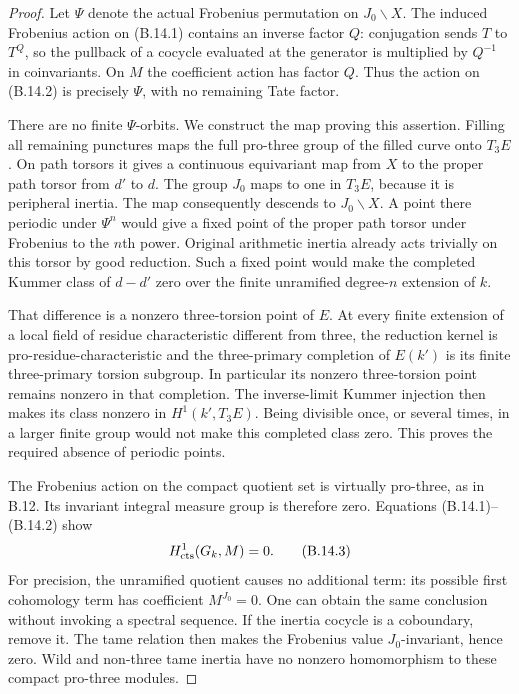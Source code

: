 \begin{proof}
Let $\Psi$ denote the actual Frobenius permutation
on $J_0\backslash X$.
The induced Frobenius action on (B.14.1) contains
an inverse factor $Q$: conjugation sends
$T$ to $T^Q$, so the pullback of a cocycle
evaluated at the generator is multiplied by
$Q^{-1}$ in coinvariants.
On $M$ the coefficient action has factor $Q$.
Thus the action on (B.14.2) is precisely $\Psi$,
with no remaining Tate factor.

There are no finite $\Psi$-orbits.
We construct the map proving this assertion.
Filling all remaining punctures maps the full
pro-three group of the filled curve onto $T_3E$.
On path torsors it gives a continuous equivariant
map from $X$ to the proper path torsor from
$d'$ to $d$. The group $J_0$ maps to one in
$T_3E$, because it is peripheral inertia.
The map consequently descends to
$J_0\backslash X$.
A point there periodic under $\Psi^n$ would
give a fixed point of the proper path torsor
under Frobenius to the $n$th power.
Original arithmetic inertia already acts
trivially on this torsor by good reduction.
Such a fixed point would make the completed
Kummer class of $d-d'$ zero over the finite
unramified degree-$n$ extension of $k$.

That difference is a nonzero three-torsion
point of $E$. At every finite extension of
a local field of residue characteristic
different from three, the reduction kernel
is pro-residue-characteristic and the
three-primary completion of $E(k')$ is its
finite three-primary torsion subgroup.
In particular its nonzero three-torsion
point remains nonzero in that completion.
The inverse-limit Kummer injection then
makes its class nonzero in $H^1(k',T_3E)$.
Being divisible once, or several times,
in a larger finite group would not make
this completed class zero. This proves
the required absence of periodic points.

The Frobenius action on the compact quotient
set is virtually pro-three, as in B.12.
Its invariant integral measure group is
therefore zero. Equations (B.14.1)--(B.14.2)
show
\[
             H^1_{\rm cts}(G_k,M)=0.                       \tag{B.14.3}
\]
For precision, the unramified quotient causes
no additional term: its possible first
cohomology term has coefficient $M^{J_0}=0$.
One can obtain the same conclusion without
invoking a spectral sequence. If the inertia
cocycle is a coboundary, remove it. The tame
relation then makes the Frobenius value
$J_0$-invariant, hence zero. Wild and
non-three tame inertia have no nonzero
homomorphism to these compact pro-three
modules.


\end{proof}
